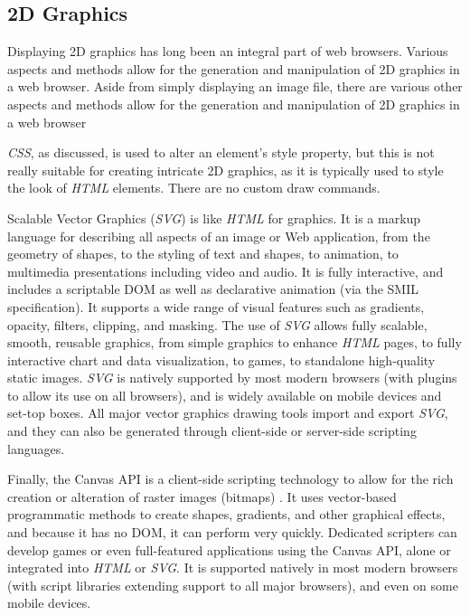 \documentclass[a4paper,11pt,twoside]{article}
\begin{document}
\subsection{2D Graphics}

Displaying 2D graphics has long been an integral part of web browsers. Various aspects and methods allow for the generation and manipulation of 2D graphics in a web browser. Aside from simply displaying an image file, there are various other aspects and methods allow for the generation and manipulation of 2D graphics in a web browser

\textit{CSS}, as discussed, is used to alter an element's style property, but this is not really suitable for creating intricate 2D graphics, as it is typically used to style the look of \textit{HTML} elements. There are no custom draw commands.

Scalable Vector Graphics (\textit{SVG}) is like \textit{HTML} for graphics\cite{svg}. It is a markup language for describing all aspects of an image or Web application, from the geometry of shapes, to the styling of text and shapes, to animation, to multimedia presentations including video and audio. It is fully interactive, and includes a scriptable DOM as well as declarative animation (via the SMIL specification). It supports a wide range of visual features such as gradients, opacity, filters, clipping, and masking.
The use of \textit{SVG} allows fully scalable, smooth, reusable graphics, from simple graphics to enhance \textit{HTML} pages, to fully interactive chart and data visualization, to games, to standalone high-quality static images. \textit{SVG} is natively supported by most modern browsers (with plugins to allow its use on all browsers), and is widely available on mobile devices and set-top boxes. All major vector graphics drawing tools import and export \textit{SVG}, and they can also be generated through client-side or server-side scripting languages.

Finally, the Canvas API is a client-side scripting technology to allow for the rich creation or alteration of raster images (bitmaps) . It uses vector-based programmatic methods to create shapes, gradients, and other graphical effects, and because it has no DOM, it can perform very quickly. Dedicated scripters can develop games or even full-featured applications using the Canvas API, alone or integrated into \textit{HTML} or \textit{SVG}. It is supported natively in most modern browsers (with script libraries extending support to all major browsers), and even on some mobile devices.
\end{document}
